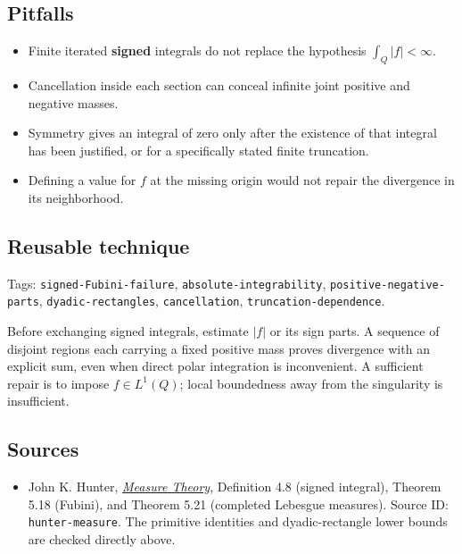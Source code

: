 \documentclass[
  11pt,
]{article}
\providecommand{\tightlist}{%
  \setlength{\itemsep}{0pt}\setlength{\parskip}{0pt}}
\begin{document}
\subsection{Pitfalls}\label{pitfalls-3}

\begin{itemize}
\tightlist
\item
  Finite iterated \textbf{signed} integrals do not replace the
  hypothesis \(\int_Q|f|<\infty\).
\item
  Cancellation inside each section can conceal infinite joint positive
  and negative masses.
\item
  Symmetry gives an integral of zero only after the existence of that
  integral has been justified, or for a specifically stated finite
  truncation.
\item
  Defining a value for \(f\) at the missing origin would not repair the
  divergence in its neighborhood.
\end{itemize}

\subsection{Reusable technique}\label{reusable-technique-3}

\begingroup\small\raggedright Tags: \texttt{signed-\allowbreak{}Fubini-\allowbreak{}failure}, \texttt{absolute-\allowbreak{}integrability},
\texttt{positive-\allowbreak{}negative-\allowbreak{}parts}, \texttt{dyadic-\allowbreak{}rectangles},
\texttt{cancellation}, \texttt{truncation-\allowbreak{}dependence}.\par\endgroup

Before exchanging signed integrals, estimate \(|f|\) or its sign parts.
A sequence of disjoint regions each carrying a fixed positive mass
proves divergence with an explicit sum, even when direct polar
integration is inconvenient. A sufficient repair is to impose
\(f\in L^1(Q)\); local boundedness away from the singularity is
insufficient.

\subsection{Sources}\label{sources-3}

\begin{itemize}
\tightlist
\item
  John K. Hunter,
  \href{https://www.math.ucdavis.edu/~hunter/measure_theory/measure_notes.pdf}{\emph{Measure
  Theory}}, Definition 4.8 (signed integral), Theorem 5.18 (Fubini), and
  Theorem 5.21 (completed Lebesgue measures). Source ID:
  \texttt{hunter-\allowbreak{}measure}. The primitive identities and dyadic-rectangle
  lower bounds are checked directly above.
\end{itemize}
\end{document}
